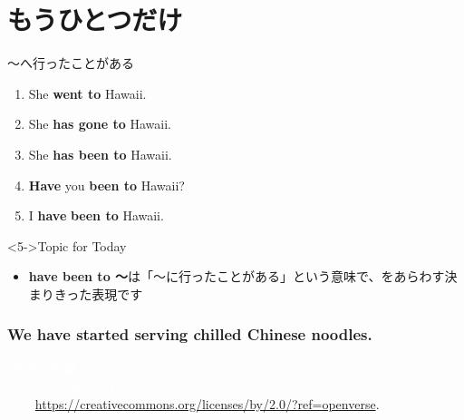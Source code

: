 \documentclass[aspectratio=169,xcolor={dvipsnames,table}]{beamer}
\begin{document}
\section{もうひとつだけ}\begin{frame}[plain]{～へ行ったことがある}

\begin{enumerate}
 \item<1-> She \textbf{went to} Hawaii.
 \item<2-> She \textbf{has gone to} Hawaii.
 \item<3-> She \textbf{has been to} Hawaii.
 \item<4-> \textbf{Have} you  \textbf{been to} Hawaii?
 \item<5-> I \textbf{have}  \textbf{been to} Hawaii.
\end{enumerate}

\vfill

\begin{block}<5->{Topic for Today}\small
\textdbend
\begin{itemize}[square]\small
 \item \textbf{have been to ～}は「～に行ったことがある」という意味で、をあらわす決まりきった表現です
\end{itemize}
\end{block}
\end{frame}
{
  \begin{frame}[t]
    \frametitle{We have started serving chilled Chinese noodles.}
\tiny
\raggedright
  \textcolor{white}{ ``冷やし中華'' by Roulex45 is licensed under CC BY 2.0. }\\
   \textcolor{white}{To view a copy of this license,}\\
\textcolor{white}{visit \url{https://creativecommons.org/licenses/by/2.0/?ref=openverse}}.
  \end{frame}
}
\end{document}
